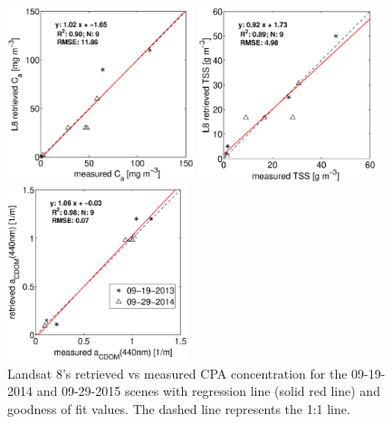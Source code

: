 \documentclass[onecolumn,3p,letterpaper]{elsarticle}
\begin{document}
\begin{figure}[htb]
  \begin{minipage}[c]{0.32\linewidth}
      \includegraphics[trim=40 0 80 0,clip,height=5.1cm]{./Images/CHLretvsmea150423}  
  \end{minipage}
  \begin{minipage}[d]{0.32\linewidth}
      \includegraphics[trim=40 0 80 0,clip,height=5.1cm]{./Images/TSSretvsmea150423}
  \end{minipage}
  \begin{minipage}[c]{0.32\linewidth}
      \includegraphics[trim=40 0 80 0,clip,height=5.1cm]{./Images/CDOMretvsmea150423}  
  \end{minipage}

  \caption{Landsat 8's retrieved vs measured CPA concentration for the 09-19-2014 and 09-29-2015 scenes with regression line (solid red line) and goodness of fit values. The dashed line represents the 1:1 line. \label{fig:CPAsRetVSMea} } 
\end{figure}
\end{document}
